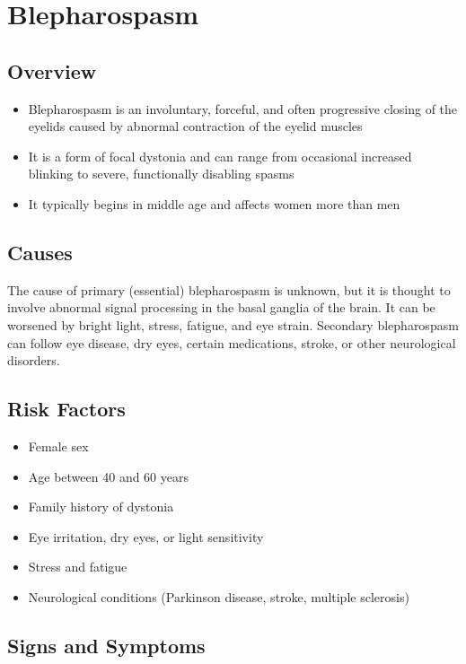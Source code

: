 \chapter{Blepharospasm}
\label{sec:Blepharospasm}

\section{Overview}
\begin{itemize}[noitemsep]
  \item Blepharospasm is an involuntary, forceful, and often progressive closing of the eyelids caused by abnormal contraction of the eyelid muscles
  \item It is a form of focal dystonia and can range from occasional increased blinking to severe, functionally disabling spasms
  \item It typically begins in middle age and affects women more than men
\end{itemize}
\section{Causes}
The cause of primary (essential) blepharospasm is unknown, but it is thought to involve abnormal signal processing in the basal ganglia of the brain. It can be worsened by bright light, stress, fatigue, and eye strain. Secondary blepharospasm can follow eye disease, dry eyes, certain medications, stroke, or other neurological disorders.
\section{Risk Factors}
\begin{itemize}[noitemsep]
  \item Female sex
  \item Age between 40 and 60 years
  \item Family history of dystonia
  \item Eye irritation, dry eyes, or light sensitivity
  \item Stress and fatigue
  \item Neurological conditions (Parkinson disease, stroke, multiple sclerosis)
\end{itemize}
\section{Signs and Symptoms}
